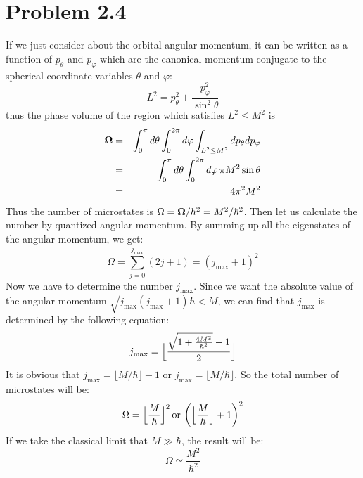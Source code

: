\documentclass{article}
\begin{document}
\section*{Problem 2.4}
If we just consider about the orbital angular momentum, it can be written as a function of $p_\theta$ and $p_\varphi$ which are the canonical momentum conjugate to the spherical coordinate variables $\theta$ and $\varphi$: 
\begin{equation}
L^2 = p_\theta^2 + \frac{p_\varphi^2}{\sin^2 \theta}
\end{equation}
thus the phase volume of the region which satisfies $L^2 \leq M^2$ is
\begin{eqnarray}
\bf{\Omega}& = &\int_0^\pi d\theta \int_0^{2\pi} d\varphi \int_{L^2\leq M^2} dp_\theta dp_\varphi\nonumber\\
&=& \int_0^\pi d\theta \int_0^{2\pi} d\varphi \, \pi  M^2\sin\theta\nonumber\\
&=& 4\pi^2 M^2
\end{eqnarray}
Thus the number of microstates is $\Omega = {\bf{\Omega}}/h^2 = M^2/\hbar^2$. Then let us calculate the number by quantized angular momentum. By summing up all the eigenstates of the angular momentum, we get:
\begin{equation}
\Omega = \sum_{j=0}^{j_{\mathrm{max}}}(2j+1) = (j_{\mathrm{max}}+1)^2
\end{equation}
Now we have to determine the number $j_{\mathrm{max}}$. Since we want the absolute value of the angular momentum $ \sqrt{j_{\mathrm{max}}(j_{\mathrm{max}}+1)}\hbar< M$, we can find that $j_{\mathrm{max}}$ is determined by the following equation:
\begin{equation}
j_{\mathrm{max}} = \Big{\lfloor} \frac{\sqrt{1+\frac{4M^2}{\hbar^2}}-1}{2}\Big{\rfloor}
\end{equation}
It is obvious that $j_\mathrm{max} = \lfloor M/\hbar\rfloor -1$ or $j_\mathrm{max} = \lfloor M/\hbar\rfloor$. So the total number of microstates will be:
\begin{equation}
\Omega = \Big{\lfloor} \frac{M}{\hbar}\Big{\rfloor}^2\,\mathrm{or}\,\left(\Big{\lfloor} \frac{M}{\hbar}\Big{\rfloor}+1\right)^2
\end{equation}
If we take the classical limit that $M \gg \hbar$, the result will be:
\begin{equation}
\Omega \simeq \frac{M^2}{\hbar^2}
\end{equation}
\end{document}
